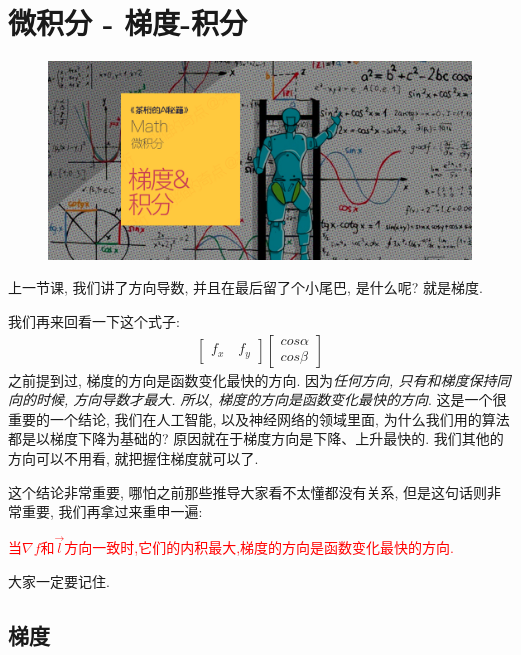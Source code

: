 \chapter{微积分 - 梯度-积分}

\begin{figure}[ht]
  \centering
  \includegraphics[width=1\textwidth]{asset/茶桁的AI秘籍_Math_12.png}
\end{figure}

\newpage

上一节课, 我们讲了方向导数, 并且在最后留了个小尾巴, 是什么呢? 就是梯度. 

我们再来回看一下这个式子:
\begin{align*}
  \begin{bmatrix} f_x \quad f_y  \end{bmatrix}
  \begin{bmatrix} cos \alpha \\ cos \beta \end{bmatrix}
\end{align*}
之前提到过, 梯度的方向是函数变化最快的方向. 因为\textit{任何方向, 只有和梯度保持同向的时候, 方向导数才最大. 所以, 梯度的方向是函数变化最快的方向}. 这是一个很重要的一个结论, 我们在人工智能, 以及神经网络的领域里面, 为什么我们用的算法都是以梯度下降为基础的? 原因就在于梯度方向是下降、上升最快的. 我们其他的方向可以不用看, 就把握住梯度就可以了. 

这个结论非常重要, 哪怕之前那些推导大家看不太懂都没有关系, 但是这句话则非常重要, 我们再拿过来重申一遍:

\textcolor{red}{当$\nabla f$和$\vec l$方向一致时,它们的内积最大,梯度的方向是函数变化最快的方向. }

大家一定要记住. 

\section{梯度}

